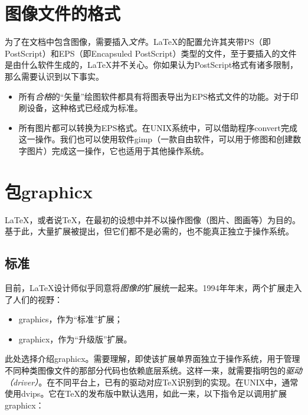 \section{图像文件的格式}

为了在文档中包含图像，需要插入\emph{文件}。\LaTeX 的配置允许其夹带PS（即PostScript）和EPS（即Encapsuled PostScript）类型的文件，至于要插入的文件是由什么软件生成的，\LaTeX 并不关心。你如果认为PostScript格式有诸多限制，那么需要认识到以下事实。

\begin{itemize}
    \item 所有\emph{合格}的``矢量''绘图软件都具有将图表导出为EPS格式文件的功能。对于印刷设备，这种格式已经成为标准。
    \item 所有图片都可以转换为EPS格式。在UNIX系统中，可以借助程序\textsf{convert}完成这一操作。我们也可以使用软件\textsf{gimp}（一款自由软件，可以用于修图和创建数字图片）完成这一操作，它也适用于其他操作系统。
\end{itemize}

\section{包\textsf{graphicx}}

\LaTeX ，或者说\TeX ，在最初的设想中并不以操作图像（图片、图画等）为目的。基于此，大量扩展被提出，但它们都不是必需的，也不能真正独立于操作系统。

\subsection{标准}

目前，\LaTeX 设计师似乎同意将\emph{图像的}扩展统一起来。1994年年末，两个扩展走入了人们的视野：

\begin{itemize}
    \item \textsf{graphics}，作为``标准''扩展；
    \item \textsf{graphicx}，作为``升级版''扩展。
\end{itemize}

此处选择介绍\textsf{graphicx}。需要理解，即使该扩展单界面独立于操作系统，用于管理不同种类图像文件的那部分代码也依赖底层系统。这样一来，就需要指明包的\emph{驱动（driver）}。在不同平台上，已有的驱动对应\TeX 识别到的实现。在UNIX中，通常使用\textsf{dvips}。它在\TeX 的发布版中默认选用，如此一来，以下指令足以调用扩展\textsf{graphicx}：

